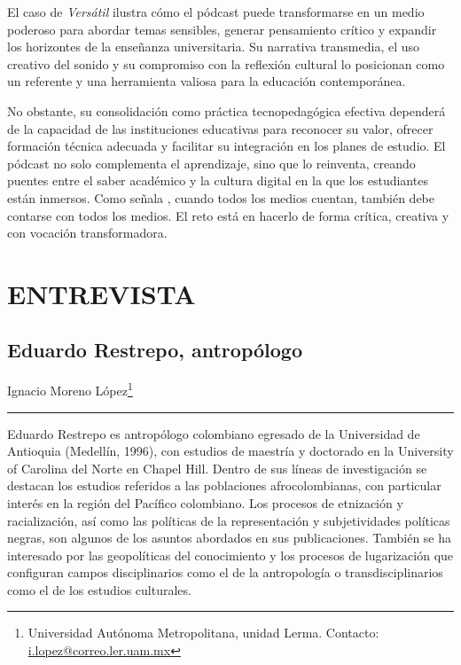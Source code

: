 \documentclass[
  spanish,
  11pt,
  a4paper,
]{scrbook}
\begin{document}
El caso de \emph{Versátil} ilustra cómo el pódcast puede transformarse
en un medio poderoso para abordar temas sensibles, generar pensamiento
crítico y expandir los horizontes de la enseñanza universitaria. Su
narrativa transmedia, el uso creativo del sonido y su compromiso con la
reflexión cultural lo posicionan como un referente y una herramienta
valiosa para la educación contemporánea.

No obstante, su consolidación como práctica tecnopedagógica efectiva
dependerá de la capacidad de las instituciones educativas para reconocer
su valor, ofrecer formación técnica adecuada y facilitar su integración
en los planes de estudio. El pódcast no solo complementa el aprendizaje,
sino que lo reinventa, creando puentes entre el saber académico y la
cultura digital en la que los estudiantes están inmersos. Como señala
\textcite{Scolari2013}, cuando todos los medios cuentan, también debe
contarse con todos los medios. El reto está en hacerlo de forma crítica,
creativa y con vocación transformadora.

\printbibliography[heading=subbibliography, title={Referencias Bibliográficas}]

\part{ENTREVISTA}

\chapter{Eduardo Restrepo,
antropólogo}\label{eduardo-restrepo-antropuxf3logo}


\begin{flushright}
\Large Ignacio Moreno López\footnote{Universidad Autónoma Metropolitana, unidad Lerma. Contacto: \href{i.lopez@correo.ler.uam.mx}{i.lopez@correo.ler.uam.mx}}
\end{flushright}

\begin{center}\rule{0.5\linewidth}{0.5pt}\end{center}

\begingroup
\footnotesize

Eduardo Restrepo es antropólogo colombiano egresado de la Universidad de
Antioquia (Medellín, 1996), con estudios de maestría y doctorado en la
University of Carolina del Norte en Chapel Hill. Dentro de sus líneas de
investigación se destacan los estudios referidos a las poblaciones
afrocolombianas, con particular interés en la región del Pacífico
colombiano. Los procesos de etnización y racialización, así como las
políticas de la representación y subjetividades políticas negras, son
algunos de los asuntos abordados en sus publicaciones. También se ha
interesado por las geopolíticas del conocimiento y los procesos de
lugarización que configuran campos disciplinarios como el de la
antropología o transdisciplinarios como el de los estudios culturales.
\end{document}
